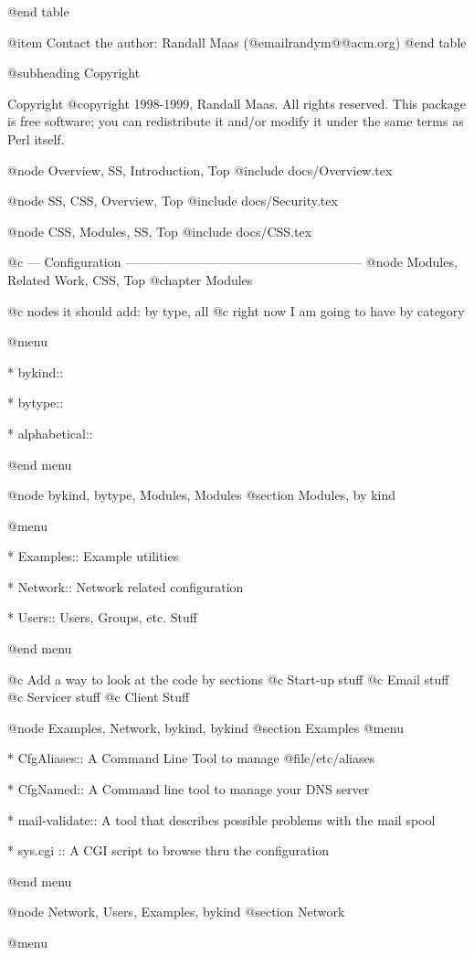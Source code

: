 @end table

@item Contact the author:
Randall Maas (@email{randym@@acm.org})
@end table

@subheading Copyright

Copyright @copyright{} 1998-1999, Randall Maas. All rights reserved.  This
package is free software; you can redistribute it and/or modify it
under the same terms as Perl itself.

@node Overview, SS, Introduction, Top
@include docs/Overview.tex

@node SS, CSS, Overview, Top
@include docs/Security.tex

@node CSS, Modules, SS, Top
@include docs/CSS.tex

@c --- Configuration --------------------------------------------------------
@node Modules, Related Work, CSS, Top
@chapter Modules

@c nodes it should add: by type, all
@c right now I am going to have by category

@menu

* bykind::

* bytype::

* alphabetical::

@end menu

@node bykind, bytype, Modules, Modules
@section Modules, by kind

@menu

* Examples:: Example utilities

* Network::  Network related configuration

* Users::    Users, Groups, etc. Stuff

@end menu

@c Add a way to look at the code by sections
@c Start-up stuff
@c Email stuff
@c Servicer stuff
@c Client Stuff


@node Examples, Network, bykind, bykind
@section Examples
@menu

* CfgAliases:: A Command Line Tool to manage @file{/etc/aliases}

* CfgNamed:: A Command line tool to manage your DNS server

* mail-validate:: A tool that describes possible problems with the mail spool

* sys.cgi :: A CGI script to browse thru the configuration

@end menu

@node Network, Users, Examples, bykind
@section Network

@menu

